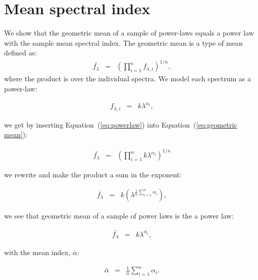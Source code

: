 \documentclass{aa}    %
\newcommand{\Eq}[1]{Equation~(\ref{eq:#1})}
\newcommand{\eq}[1]{\Eq{#1}}
\newcommand{\eqlabel}[1]{\label{eq:#1}}
\newcommand{\sectlabel}[1]{\label{sect:#1}}
\begin{document}
\appendix

\section{Mean spectral index}  \sectlabel{math} \label{math}


We show that the geometric mean of a sample of power-laws equals a power law
with the sample mean spectral index. The geometric mean is a type of mean
defined as:
\begin{eqnarray}\eqlabel{geometric mean}
\bar{f_{\lambda}} &=&  \left( \prod_{i=1}^n f_{\lambda, i} \right) ^{1/n},
\end{eqnarray}
where the product is over the individual spectra. We model each spectrum as a
power-law:

\begin{eqnarray}\eqlabel{powerlaw}
f_{\lambda, i} &=&  k \lambda ^{\alpha_{i}},
\end{eqnarray}

 we get by inserting \eq{powerlaw} into \eq{geometric mean}:
 
 \begin{eqnarray}\eqlabel{deriv1}
 \bar{f_{\lambda}} &=&  \left( \prod_{i=1}^n k \lambda ^{\alpha_{i}}\right)
^{1/n}
 \end{eqnarray}

we rewrite and make the product a sum in the exponent:

 \begin{eqnarray}\eqlabel{deriv2}
 \bar{f_{\lambda}} &=&  k \left( \lambda ^{ \frac{1}{n} \sum_{i=1}^n \alpha_{i} 
}\right) ,
 \end{eqnarray}

we see that geometric mean of a sample of power laws is the a power law:

 \begin{eqnarray}\eqlabel{deriv3}
 \bar{f_{\lambda}} &=&  k \lambda ^{ \bar{\alpha_{i} }},
 \end{eqnarray}

with the mean index, $\bar{\alpha}$:

 \begin{eqnarray}\eqlabel{mean}
 \bar{\alpha} &=&  \frac{1}{n} \sum_{i=1}^n \alpha_{i} .
 \end{eqnarray}
\end{document}
